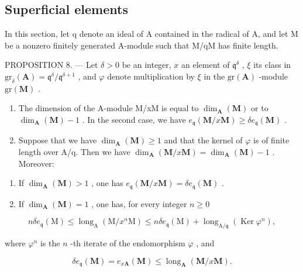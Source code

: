 \subsection{Superficial elements}

In this section, let q denote an ideal of A contained in the radical of A, and let M be a nonzero finitely generated A-module such that M/qM has finite length.

PROPOSITION 8. --- Let \(\delta > 0\) be an integer, \(x\) an element of \(\mathfrak{q}^{\delta}\) , \(\xi\) its class in \(\mathrm{gr}_{\delta}(\mathbf{A}) = \mathfrak{q}^{\delta}/\mathfrak{q}^{\delta+1}\) , and \(\varphi\) denote multiplication by \(\xi\) in the \(\mathrm{gr}(\mathbf{A})\) -module \(\mathrm{gr}(\mathbf{M})\) .

\begin{enumerate}
\def\labelenumi{\alph{enumi})}
\item
  The dimension of the A-module M/xM is equal to \(\dim_{\mathbf{A}}(\mathbf{M})\) or to \(\dim_{\mathbf{A}}(\mathbf{M}) - 1\) . In the second case, we have \(e_{\mathfrak{q}}(\mathbf{M}/x\mathbf{M}) \geqslant \delta e_{\mathfrak{q}}(\mathbf{M})\) .
\item
  Suppose that we have \(\dim_{\mathbf{A}}(\mathbf{M}) \geqslant 1\) and that the kernel of \(\varphi\) is of finite length over A/q. Then we have \(\dim_{\mathbf{A}}(\mathbf{M}/x\mathbf{M}) = \dim_{\mathbf{A}}(\mathbf{M}) - 1\) . Moreover:
\end{enumerate}

\begin{enumerate}
\def\labelenumi{(\roman{enumi})}
\item
  If \(\dim_{\mathbf{A}}(\mathbf{M}) > 1\) , one has \(e_{\mathfrak{q}}(\mathbf{M} / x\mathbf{M}) = \delta e_{\mathfrak{q}}(\mathbf{M})\) .
\item
  If \(\dim_{\mathbf{A}}(\mathbf{M}) = 1\) , one has, for every integer \(n \geqslant 0\)
\end{enumerate}

\[
n \delta e _ {\mathfrak {q}} (\mathrm{M}) \leqslant \operatorname{long} _ {\mathrm{A}} (\mathrm{M} / x ^ {n} \mathrm{M}) \leqslant n \delta e _ {\mathfrak {q}} (\mathrm{M}) + \operatorname{long} _ {\mathrm{A} / \mathfrak {q}} (\operatorname{Ker} \varphi^ {n}),
\]

where \(\varphi^n\) is the \(n\) -th iterate of the endomorphism \(\varphi\) , and

\[
\delta e _ {\mathfrak {q}} (\mathbf {M}) = e _ {x \mathbf {A}} (\mathbf {M}) \leqslant \operatorname{long} _ {\mathbf {A}} (\mathbf {M} / x \mathbf {M}).
\]

